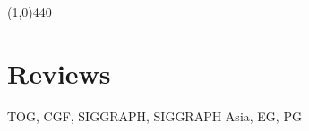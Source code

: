 \documentclass[margin,line]{resume}
\begin{document}
\begin{resume}


    \vspace{-5.0mm}
    \line(1,0){440}
    \vspace{-5.0mm}

    \section{\mysidestyle Reviews}

    TOG, CGF, SIGGRAPH, SIGGRAPH Asia, EG, PG                    \\






\end{resume}
\end{document}

